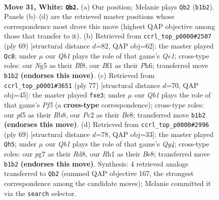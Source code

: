 \documentclass[11pt]{article}
\begin{document}
\clearpage

\begin{figure}[p]\centering
\begin{subfigure}{0.46\textwidth}\centering
\resizebox{\linewidth}{!}{%
\newchessgame
\chessboard[
  setfen={1n2r1k1/3b1ppp/2q5/4PpN1/p4P2/8/P1P2KPP/1Q3B1R w - - 4 31},
  showmover=false,
  pgfstyle=straightmove, color=movearrow, markmove={b1-b2}
]}
\caption{}
\end{subfigure}\hfill
\begin{subfigure}{0.46\textwidth}\centering
\resizebox{\linewidth}{!}{%
\newchessgame
\chessboard[
  setfen={4qbk1/5pp1/p6p/1p1Q4/nP6/P3N2P/3B1PP1/6K1 b - - 1 35},
  showmover=false,
  pgfstyle=straightmove, color=movearrow, markmove={e8-c8}
]}
\caption{}
\end{subfigure}
\\[4pt]
\begin{subfigure}{0.46\textwidth}\centering
\resizebox{\linewidth}{!}{%
\newchessgame
\chessboard[
  setfen={1r2b1k1/4q2p/3pP3/3Bn1p1/4Np2/4P2P/1p3PP1/1R1Q2K1 b - - 3 39},
  showmover=false,
  pgfstyle=straightmove, color=movearrow, markmove={f4-e3}
]}
\caption{}
\end{subfigure}\hfill
\begin{subfigure}{0.46\textwidth}\centering
\resizebox{\linewidth}{!}{%
\newchessgame
\chessboard[
  setfen={3rb1k1/1p3pp1/pP2p3/P5q1/2B3n1/1NP3P1/1B2Q3/4R1K1 b - - 4 35},
  showmover=false,
  pgfstyle=straightmove, color=movearrow, markmove={g5-h5}
]}
\caption{}
\end{subfigure}
\caption{\textbf{Move 31, White: \texttt{Qb2}.} (a) Our position; Melanie plays \texttt{Qb2} (\texttt{b1b2}). Panels (b)--(d) are the retrieved master positions whose correspondence most drove this move (highest QAP objective among those that transfer to it). (b) Retrieved from \texttt{ccrl\_top\_p0000\#2507} (ply 69) [structural distance $d$=82, QAP obj=62]: the master played \texttt{Qc8}; under $\mu$ our \emph{Qb1} plays the role of that game's \emph{Qe1}; cross-type roles: our \emph{N}g5 as their \emph{B}f8, our \emph{B}f1 as their \emph{P}h6; transferred move \texttt{b1b2} \textbf{(endorses this move)}. (c) Retrieved from \texttt{ccrl\_top\_p0001\#3651} (ply 77) [structural distance $d$=70, QAP obj=45]: the master played \texttt{fxe3}; under $\mu$ our \emph{Qb1} plays the role of that game's \emph{Pf5} (a \textbf{cross-type} correspondence); cross-type roles: our \emph{p}f5 as their \emph{R}b8, our \emph{P}c2 as their \emph{B}e8; transferred move \texttt{b1b2} \textbf{(endorses this move)}. (d) Retrieved from \texttt{ccrl\_top\_p0000\#2996} (ply 69) [structural distance $d$=78, QAP obj=33]: the master played \texttt{Qh5}; under $\mu$ our \emph{Qb1} plays the role of that game's \emph{Qg4}; cross-type roles: our \emph{p}g7 as their \emph{R}d8, our \emph{R}h1 as their \emph{B}e8; transferred move \texttt{b1b2} \textbf{(endorses this move)}. Synthesis: 4 retrieved analogs transferred to \texttt{Qb2} (summed QAP objective 167, the strongest correspondence among the candidate moves); Melanie committed it via the \texttt{search} selector.}
\label{fig:thought-m60}
\end{figure}
\end{document}
